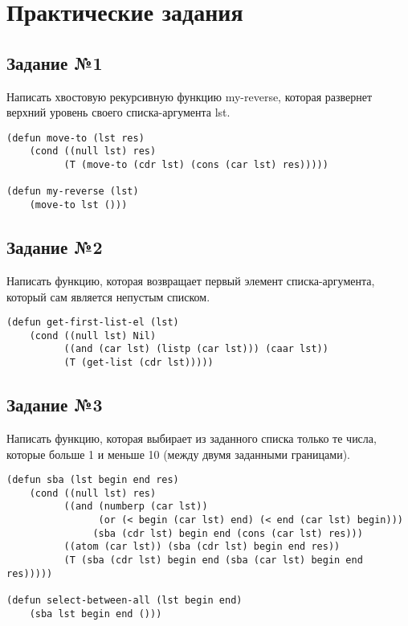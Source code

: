 \chapter{Практические задания}

\section{Задание №1}

Написать хвостовую рекурсивную функцию my-reverse, которая развернет верхний
уровень своего списка-аргумента lst.

\vspace{4mm}
\hfill
\begin{minipage}{0.92\linewidth}
\begin{lstlisting}
(defun move-to (lst res)
    (cond ((null lst) res)
          (T (move-to (cdr lst) (cons (car lst) res)))))

(defun my-reverse (lst)
    (move-to lst ()))
\end{lstlisting}
\end{minipage}

\section{Задание №2}

Написать функцию, которая возвращает первый элемент списка-аргумента, который
сам является непустым списком.

\vspace{4mm}
\begin{minipage}{0.92\linewidth}
\begin{lstlisting}
(defun get-first-list-el (lst)
    (cond ((null lst) Nil)
          ((and (car lst) (listp (car lst))) (caar lst))
          (T (get-list (cdr lst)))))
\end{lstlisting}
\end{minipage}

\section{Задание №3}

Написать функцию, которая выбирает из заданного списка только те числа,
которые больше 1 и меньше 10 (между двумя заданными границами).

\vspace{4mm}
\begin{minipage}{0.92\linewidth}
\begin{lstlisting}
(defun sba (lst begin end res)
    (cond ((null lst) res)
          ((and (numberp (car lst))
                (or (< begin (car lst) end) (< end (car lst) begin)))
               (sba (cdr lst) begin end (cons (car lst) res)))
          ((atom (car lst)) (sba (cdr lst) begin end res))
          (T (sba (cdr lst) begin end (sba (car lst) begin end res)))))

(defun select-between-all (lst begin end)
    (sba lst begin end ()))
\end{lstlisting}
\end{minipage}

